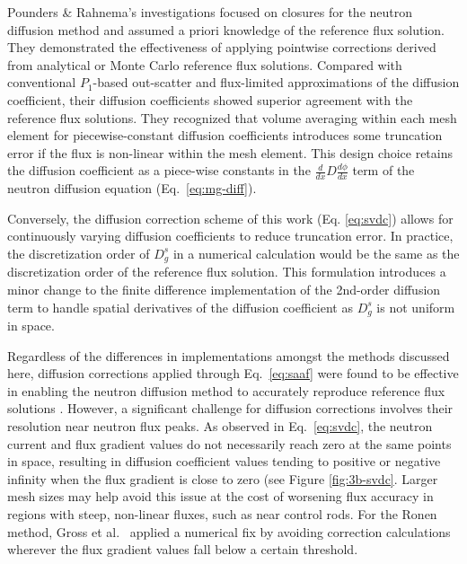 Pounders \& Rahnema's \cite{pounders_diffusion_2009} investigations focused on closures for the neutron diffusion method and
assumed a priori knowledge of the reference flux solution.
They demonstrated the effectiveness of applying
pointwise corrections derived from analytical or Monte Carlo reference flux solutions. Compared
with conventional $P_1$-based out-scatter and flux-limited approximations of the diffusion
coefficient, their diffusion coefficients showed superior agreement
with the reference flux solutions. They recognized that volume averaging within each mesh element
for piecewise-constant diffusion coefficients introduces some truncation error if the flux is
non-linear within the mesh element. This design choice retains the diffusion coefficient as a
piece-wise constants in the $\frac{d}{dx}D\frac{d\phi}{dx}$ term of the neutron
diffusion equation (Eq.\ \ref{eq:mg-diff}).

Conversely, the diffusion correction scheme of this work (Eq. \ref{eq:svdc}) allows for continuously
varying diffusion coefficients to reduce truncation error. In practice, the discretization order of
$D^s_g$ in a numerical calculation would be the same as the discretization order of
the reference flux solution. This formulation introduces a minor change to the finite difference
implementation of the 2nd-order diffusion term to handle spatial derivatives of the
diffusion coefficient as $D^s_g$ is not uniform in space.

Regardless of the differences in implementations amongst the methods discussed here,
diffusion corrections applied through Eq.\ \ref{eq:saaf} were
found to be effective in enabling the neutron diffusion method to accurately reproduce reference
flux solutions \cite{gross_comprehensive_2023, pounders_diffusion_2009}.
However, a significant challenge for diffusion corrections
involves their resolution near neutron flux peaks. As observed in Eq.\ \ref{eq:svdc}, the neutron
current and flux gradient values do not necessarily reach zero at the same points in space,
resulting in diffusion coefficient values tending to positive or negative infinity when the
flux gradient is close to zero (see Figure \ref{fig:3b-svdc}. Larger mesh sizes may help avoid this
issue at the cost of worsening flux accuracy in regions with
steep, non-linear fluxes, such as near control rods. For the Ronen method, Gross et al.\
\cite{gross_comprehensive_2023} applied a numerical fix by avoiding correction
calculations wherever the flux gradient values fall below a certain threshold. 

